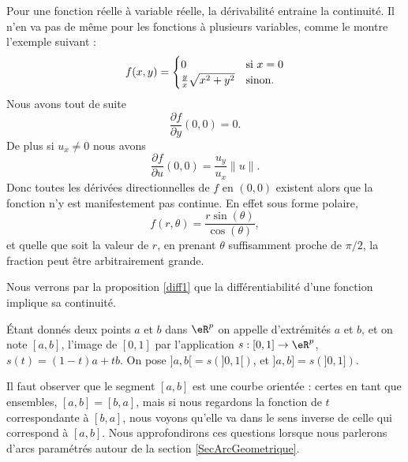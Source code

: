 \begin{example}
    Pour une fonction réelle à variable réelle, la dérivabilité entraine la continuité. Il n'en va pas de même pour les fonctions à plusieurs variables, comme le montre l'exemple suivant :
    \begin{equation}
        f(x,y)=\begin{cases}
            0    &   \text{si \( x=0\)}\\
            \frac{ y }{ x }\sqrt{x^2+y^2}    &    \text{sinon.}
        \end{cases}
    \end{equation}
    Nous avons tout de suite
    \begin{equation}
        \frac{ \partial f }{ \partial y }(0,0)=0.
    \end{equation}
    De plus si \( u_x\neq 0\) nous avons
    \begin{equation}
            \frac{ \partial f }{ \partial u }(0,0)=\frac{ u_y }{ u_x }\| u \|.
    \end{equation}
    Donc toutes les dérivées directionnelles de \( f\) en \( (0,0)\) existent alors que la fonction n'y est manifestement pas continue. En effet sous forme polaire,
    \begin{equation}
        f(r,\theta)=\frac{ r\sin(\theta) }{ \cos(\theta) },
    \end{equation}
    et quelle que soit la valeur de \( r\), en prenant \( \theta\) suffisamment proche de \( \pi/2\), la fraction peut être arbitrairement grande.

    Nous verrons par la proposition \ref{diff1} que la différentiabilité d'une fonction implique sa continuité.
\end{example}

\begin{definition}
	Étant donnés deux points $a$ et $b$ dans $\eR^p$ on appelle  d'extrémités $a$ et $b$, et on note $[a,b]$, l'image de $[0,1]$ par l'application $s: [0,1]\to \eR^p$, $s(t)= (1-t)a+tb$.  On pose $]a,b[=s\left(]0,1[\right)$, et  $]a,b]=s\left(]0,1]\right)$. 
\end{definition}
Il faut observer que le segment $[a,b]$ est une courbe orientée : certes en tant que ensembles, $[a,b]=[b,a]$, mais si nous regardons la fonction de $t$ correspondante à $[b,a]$, nous voyons qu'elle va dans le sens inverse de celle qui correspond à $[a,b]$. Nous approfondirons ces questions lorsque nous parlerons d'arcs paramétrés autour de la section \ref{SecArcGeometrique}.

